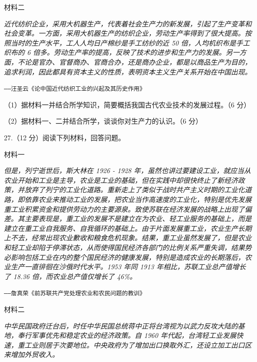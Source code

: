 \documentclass{ctexart}
\begin{document}
\textsf{材料二}

\textit{近代纺织企业，采用大机器生产，代表着社会生产力的新发展，引起了生产变革和社会变革。一方面，采用大机器生产的纺织企业，劳动生产率得到了很大提高。按照当时的生产水平，工人人均日产棉纱是手工纺纱的近 50 倍，人均机织布是手工织布的 6 倍多。劳动生产率的提高，反映了技术的进步和生产力的发展。另一方面，不论是官办、官督商办、官商合办，还是商办企业，都是以商品生产为目的，追求利润，因此都具有资本主义的性质，表明资本主义生产关系开始在中国出现。}

\begin{flushright}

\texttt{——汪圣云《论中国近代纺织工业的兴起及其历史作用》}

\end{flushright}

（1）据材料一并结合所学知识，简要概括我国古代农业技术的发展过程。（6 分）

（2）据材料一、二并结合所学，谈谈你对生产力的认识。（6 分）

\bigskip

27.（12 分）阅读下列材料，回答问题。

\textsf{材料一}

\textit{但是，列宁逝世后，斯大林在 1926 - 1928 年，虽然也讲过要建设工业，就应当从农业开始和工业是主导，农业是工业的基础，但在实践中却很快终止了新经济政策，并放弃了列宁的工业化道路。重新走上了类似于战时共产主义时期的工业化道路，即依靠农业来推动工业的发展，把农业当作高速度的工业化，特别是优先发展重工业积累资金和提供劳动力的主要源泉。致使苏联在经济发展的战略上出现了偏差。其主要表现是，重工业的发展不是建立在为农业、轻工业服务的基础上，而是建立在重工业自我服务、自我循环的基础上。由于片面发展重工业，农业生产长期上不去，经常出现农业歉收和粮食危机现象。结果，重工业虽然发展了，但是农业和轻工业却陷于停滞状态，从而使得国民经济各部门的比例关系严重失调，结果势必影响包括工业在内的整个国民经济的健康发展，特别是造成农业的长期落后，农业生产一直徘徊在沙俄时代水平。1953 年同 1913 年相比，苏联工业总产值增长了 18.36 倍，而农业总产值仅增长了 46\%。}

\begin{flushright}

\texttt{——詹真荣《前苏联共产党处理农业和农民问题的教训》}

\end{flushright}

\textsf{材料二}

\textit{中华民国政府迁台后，时任中华民国总统蒋中正将台湾视为以武力反攻大陆的基地，奉行军事优先和稳定农业的经济政策。自 1960 年代起，台湾轻工业发展快速，重工业则居于次要地位。中央政府为了增加出口换取外汇，还设立加工出口区来增加外贸收入。}
\end{document}
